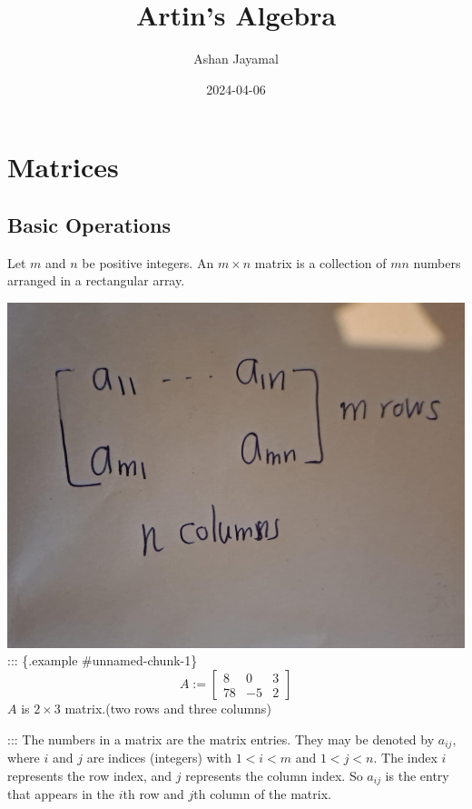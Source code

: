 \documentclass[
]{book}
\title{Artin's Algebra}
\author{Ashan Jayamal}
\date{2024-04-06}
\theoremstyle{definition}
\theoremstyle{definition}
\theoremstyle{definition}
\theoremstyle{definition}
\theoremstyle{remark}
\begin{document}
\maketitle

{
\setcounter{tocdepth}{1}
\tableofcontents
}
\hypertarget{matrices}{%
\chapter{Matrices}\label{matrices}}

\hypertarget{basic-operations}{%
\section{Basic Operations}\label{basic-operations}}

Let \(m\) and \(n\) be positive integers. An \(m \times n\) matrix is a collection of \(mn\) numbers arranged in a rectangular array.

\includegraphics{figures/ch_1/fig01.jpg}
::: \{.example \#unnamed-chunk-1\}
\[A:=\begin{bmatrix}
8 & 0 & 3\\
78 & -5 & 2
\end{bmatrix}\]
\(A\) is \(2 \times 3\) matrix.(two rows and three columns)

:::
The numbers in a matrix are the matrix entries. They may be denoted by \(a_{ij}\), where \(i\) and \(j\) are indices (integers) with \(1 < i < m\) and \(1 < j < n\). The index \(i\) represents the row index, and \(j\) represents the column index. So \(a_{ij}\) is the entry that appears in the \(i\)th row and \(j\)th column of the matrix.
\end{document}
